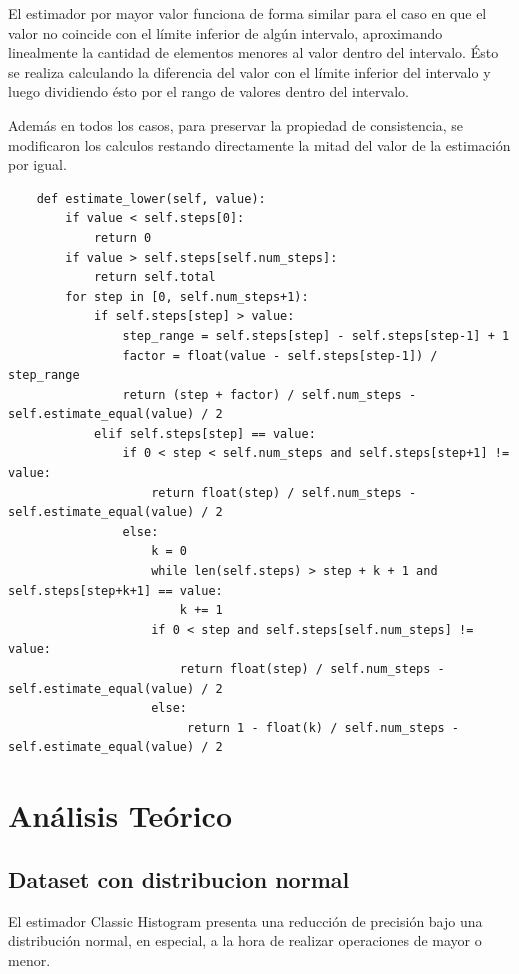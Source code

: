 \documentclass[a4paper, 10pt, twoside]{article}
\begin{document}
El estimador por mayor valor funciona de forma similar para el caso en que el valor no coincide con el límite inferior de algún intervalo, aproximando linealmente la cantidad de elementos menores al valor dentro del intervalo. Ésto se realiza calculando la diferencia del valor con el límite inferior del intervalo y luego dividiendo ésto por el rango de valores dentro del intervalo.

Además en todos los casos, para preservar la propiedad de consistencia, se modificaron los calculos restando directamente la mitad del valor de la estimación por igual.

\begin{verbatim}
    def estimate_lower(self, value):
        if value < self.steps[0]:
            return 0
        if value > self.steps[self.num_steps]:
            return self.total
        for step in [0, self.num_steps+1):
            if self.steps[step] > value:
                step_range = self.steps[step] - self.steps[step-1] + 1
                factor = float(value - self.steps[step-1]) / step_range
                return (step + factor) / self.num_steps - self.estimate_equal(value) / 2
            elif self.steps[step] == value:
                if 0 < step < self.num_steps and self.steps[step+1] != value:
                    return float(step) / self.num_steps - self.estimate_equal(value) / 2
                else:
                    k = 0
                    while len(self.steps) > step + k + 1 and self.steps[step+k+1] == value:
                        k += 1
                    if 0 < step and self.steps[self.num_steps] != value:
                        return float(step) / self.num_steps - self.estimate_equal(value) / 2
                    else:
                         return 1 - float(k) / self.num_steps - self.estimate_equal(value) / 2                       
\end{verbatim}



\section{Análisis Teórico}

\subsection{Dataset con distribucion normal}
El estimador Classic Histogram presenta una reducción de precisión bajo una distribución normal, en especial, a la hora de realizar operaciones de mayor o menor.
\end{document}
